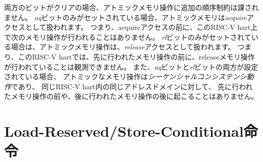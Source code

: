 \begin{comment}
If both bits are clear, no additional ordering constraints are imposed
on the atomic memory operation.  If only the {\em aq} bit is set, the
atomic memory operation is treated as an {\em acquire} access, i.e.,
no following memory operations on this RISC-V hart can be observed
to take place before the acquire memory operation.  If only the {\em
  rl} bit is set, the atomic memory operation is treated as a {\em
  release} access, i.e., the release memory operation cannot be
observed to take place before any earlier memory operations on this
RISC-V hart.  If both the {\em aq} and {\em rl} bits are set, the
atomic memory operation is {\em sequentially consistent} and cannot be
observed to happen before any earlier memory operations or after any
later memory operations in the same RISC-V hart and to the same
address domain.
\end{comment}

両方のビットがクリアの場合、アトミックメモリ操作に追加の順序制約は課されません。
{\em aq}ビットのみがセットされている場合、アトミックメモリは{\em acquire}アクセスとして扱われます。
つまり、acquireアクセスの前に、このRISC-V hart上で次のメモリ操作が行われることはありません。
{\em rl}ビットのみがセットされている場合は、アトミックメモリ操作は、{\em release}アクセスとして扱われます。 
つまり、このRISC-V hartでは、先に行われたメモリ操作の前に、releaseメモリ操作が行われていることは観測できません。 
また、{\em aq}ビットと{\em rl}ビットの両方が設定されている場合、
アトミックなメモリ操作は{\em シーケンシャルコンシステンシ動作}であり、
同じRISC-V hart内の同じアドレスドメインに対して、
先に行われたメモリ操作の前や、後に行われたメモリ操作の後に起こることはありません。

\begin{comment}
\section{Load-Reserved/Store-Conditional Instructions}
\end{comment}
\section{Load-Reserved/Store-Conditional命令}
\label{sec:lrsc}

